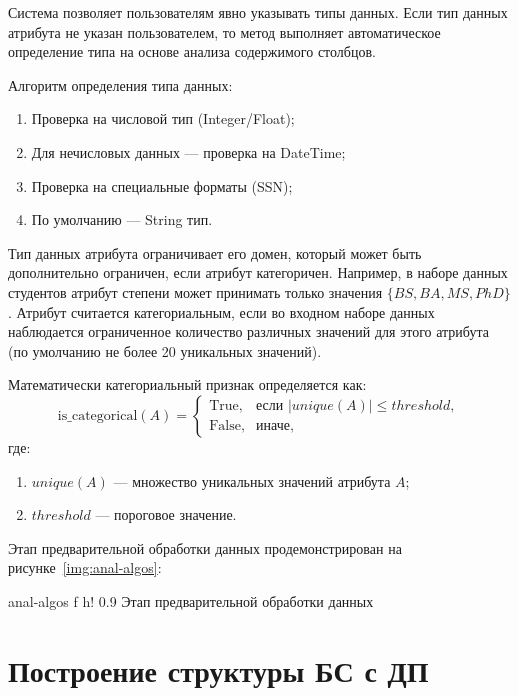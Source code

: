 Система позволяет пользователям явно указывать типы данных. Если тип данных атрибута не указан пользователем, то метод выполняет автоматическое определение типа на основе анализа содержимого столбцов.

Алгоритм определения типа данных:
\begin{enumerate}
	\item Проверка на числовой тип (Integer/Float);
	\item Для нечисловых данных --- проверка на DateTime;
	\item Проверка на специальные форматы (SSN);
	\item По умолчанию --- String тип.
\end{enumerate}

Тип данных атрибута ограничивает его домен, который может быть дополнительно ограничен, если атрибут категоричен.
Например, в наборе данных студентов атрибут степени может принимать только значения $\{BS, BA, MS, PhD\}$.
Атрибут считается категориальным, если во входном наборе данных наблюдается ограниченное количество различных значений для этого атрибута (по умолчанию не более 20 уникальных значений).

\newpage
Математически категориальный признак определяется как:
\begin{equation}
    \text{is\_categorical}(A) = \begin{cases}
        \text{True}, & \text{если } |unique(A)| \leq threshold, \\
        \text{False}, & \text{иначе},
    \end{cases}
\end{equation}
где:
\begin{enumerate}[label*=---]
	\item $unique(A)$ --- множество уникальных значений атрибута $A$;
	\item $threshold$ --- пороговое значение.
\end{enumerate}


Этап предварительной обработки данных продемонстрирован на рисунке~\ref{img:anal-algos}:

{anal-algos} %
{f} %
{h!} %
{0.9\textwidth} %
{Этап предварительной обработки данных} %
\newpage
\section{Построение структуры БС с ДП}


